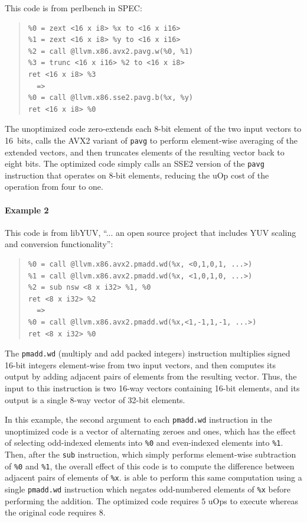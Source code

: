 This code is from perlbench in SPEC:

{\begin{quote}\begin{verbatim}
%0 = zext <16 x i8> %x to <16 x i16>
%1 = zext <16 x i8> %y to <16 x i16>
%2 = call @llvm.x86.avx2.pavg.w(%0, %1)
%3 = trunc <16 x i16> %2 to <16 x i8>
ret <16 x i8> %3
  =>
%0 = call @llvm.x86.sse2.pavg.b(%x, %y)
ret <16 x i8> %0
\end{verbatim}
\end{quote}}

The unoptimized code zero-extends each 8-bit element of the two input
vectors to 16~bits, calls the AVX2 variant of \texttt{pavg} to perform
element-wise averaging of the extended vectors, and then truncates
elements of the resulting vector back to eight bits.
%
The optimized code simply calls an SSE2 version of the \texttt{pavg}
instruction that operates on 8-bit elements, reducing the uOp cost
of the operation from four to one.


\paragraph*{Example 2}

This code is from libYUV, ``... an open source project that includes
YUV scaling and conversion
functionality'':

{\begin{quote}\begin{verbatim}
%0 = call @llvm.x86.avx2.pmadd.wd(%x, <0,1,0,1, ...>)
%1 = call @llvm.x86.avx2.pmadd.wd(%x, <1,0,1,0, ...>)
%2 = sub nsw <8 x i32> %1, %0
ret <8 x i32> %2
  =>
%0 = call @llvm.x86.avx2.pmadd.wd(%x,<1,-1,1,-1, ...>)
ret <8 x i32> %0
\end{verbatim}
\end{quote}}

The \texttt{pmadd.wd} (multiply and add packed integers) instruction multiplies
signed 16-bit integers element-wise from two input vectors, and then
computes its output by adding adjacent pairs of elements from the
resulting vector.
%
Thus, the input to this instruction is two 16-way vectors containing
16-bit elements, and its output is a single 8-way vector of 32-bit
elements.


In this example, the second argument to each \texttt{pmadd.wd}
instruction in the unoptimized code is a vector of alternating zeroes
and ones, which has the effect of selecting odd-indexed elements into
\texttt{\%0} and even-indexed elements into \texttt{\%1}.
%
Then, after the \texttt{sub} instruction, which simply performs
element-wise subtraction of \texttt{\%0} and \texttt{\%1}, the overall
effect of this code is to compute the difference between adjacent
pairs of elements of \texttt{\%x}.
%
\minotaur{} is able to perform this same computation using a single
\texttt{pmadd.wd} instruction which negates odd-numbered elements of
\texttt{\%x} before performing the addition.
%
The optimized code requires $5$ uOps to execute whereas the original
code requires $8$.


